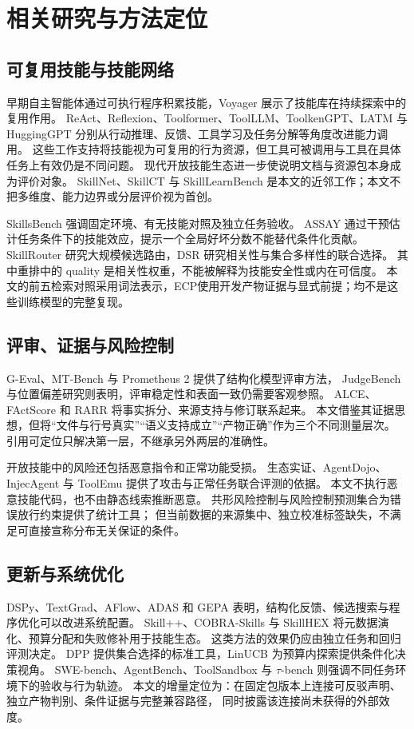 \section{相关研究与方法定位}
\subsection{可复用技能与技能网络}
早期自主智能体通过可执行程序积累技能，Voyager 展示了技能库在持续探索中的复用作用\citep{P11}。
ReAct、Reflexion、Toolformer、ToolLLM、ToolkenGPT、LATM 与 HuggingGPT 分别从行动推理、反馈、工具学习及任务分解等角度改进能力调用\citep{P12,P13,P14,P15,P16,P17,P18}。
这些工作支持将技能视为可复用的行为资源，但工具可被调用与工具在具体任务上有效仍是不同问题。
现代开放技能生态进一步使说明文档与资源包本身成为评价对象。
SkillNet、SkillCT 与 SkillLearnBench 是本文的近邻工作；本文不把多维度、能力边界或分层评价视为首创\citep{P01,P43,P44}。

SkillsBench 强调固定环境、有无技能对照及独立任务验收\citep{P02}。
ASSAY 通过干预估计任务条件下的技能效应，提示一个全局好坏分数不能替代条件化贡献\citep{P03}。
SkillRouter 研究大规模候选路由，DSR 研究相关性与集合多样性的联合选择\citep{P04,P05}。
其中重排中的 quality 是相关性权重，不能被解释为技能安全性或内在可信度。
本文的前五检索对照采用词法表示，ECP使用开发产物证据与显式前提；均不是这些训练模型的完整复现。

\subsection{评审、证据与风险控制}
G-Eval、MT-Bench 与 Prometheus 2 提供了结构化模型评审方法\citep{P24,P25,P26}，
JudgeBench 与位置偏差研究则表明，评审稳定性和表面一致仍需要客观参照\citep{P27,P28}。
ALCE、FActScore 和 RARR 将事实拆分、来源支持与修订联系起来\citep{P39,P40,P41}。
本文借鉴其证据思想，但将“文件与行号真实”“语义支持成立”“产物正确”作为三个不同测量层次。
引用可定位只解决第一层，不继承另外两层的准确性。

开放技能中的风险还包括恶意指令和正常功能受损。
生态实证、AgentDojo、InjecAgent 与 ToolEmu 提供了攻击与正常任务联合评测的依据\citep{P09,P10,P29,P30,P31}。
本文不执行恶意技能代码，也不由静态线索推断恶意。
共形风险控制与风险控制预测集合为错误放行约束提供了统计工具\citep{P36,P37}；
但当前数据的来源集中、独立校准标签缺失，不满足可直接宣称分布无关保证的条件。

\subsection{更新与系统优化}
DSPy、TextGrad、AFlow、ADAS 和 GEPA 表明，结构化反馈、候选搜索与程序优化可以改进系统配置\citep{P19,P20,P21,P22,P23}。
Skill++、COBRA-Skills 与 SkillHEX 将元数据演化、预算分配和失败修补用于技能生态\citep{P06,P07,P08}。
这类方法的效果仍应由独立任务和回归评测决定。
DPP 提供集合选择的标准工具，LinUCB 为预算内探索提供条件化决策视角\citep{P38,P42}。
SWE-bench、AgentBench、ToolSandbox 与 $\tau$-bench 则强调不同任务环境下的验收与行为轨迹\citep{P32,P33,P34,P35}。
本文的增量定位为：在固定包版本上连接可反驳声明、独立产物判别、条件证据与完整兼容路径，
同时披露该连接尚未获得的外部效度。
